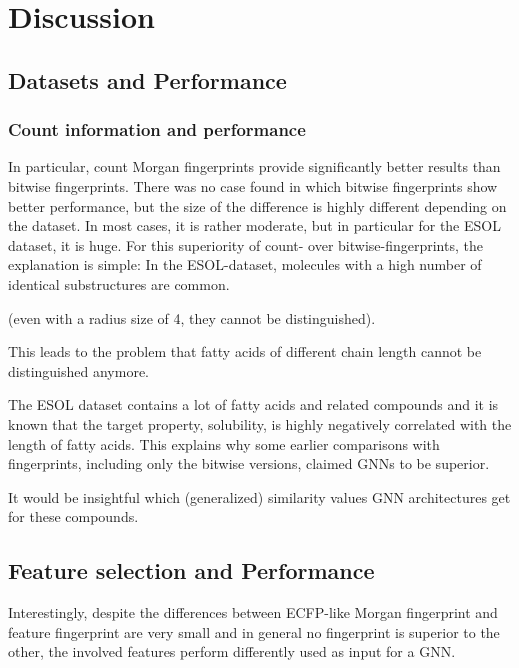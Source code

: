 \chapter{Discussion}


\section{Datasets and Performance}


\subsection{Count information and performance}

In particular, count Morgan fingerprints provide significantly better results than bitwise fingerprints. There was no case found in which bitwise fingerprints show better performance, but the size of the difference is highly different depending on the dataset. In most cases, it is rather moderate, but in particular for the ESOL dataset, it is huge.
For this superiority of count- over bitwise-fingerprints, the explanation is simple:
In the ESOL-dataset, molecules with a high number of identical substructures are common.

(even with a radius size of 4, they cannot be distinguished).

This leads to the problem that fatty acids of different chain length cannot be distinguished anymore.

The ESOL dataset contains a lot of fatty acids and related compounds and it is known that the target property, solubility, is highly negatively correlated with the length of fatty acids. This explains why some earlier comparisons with fingerprints, including only the bitwise versions, claimed GNNs to be superior.



It would be insightful which (generalized) similarity values GNN architectures get for these compounds.


\section{Feature selection and Performance}

Interestingly, despite the differences between ECFP-like Morgan fingerprint and feature fingerprint are very small and in general no fingerprint is superior to the other, the involved features perform differently used as input for a GNN.


